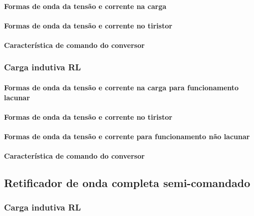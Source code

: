 \documentclass[a4paper,11pt]{article}
\numberwithin{equation}{section}
\begin{document}
\paragraph{Formas de onda da tensão e corrente na carga}

\paragraph{Formas de onda da tensão e corrente no tiristor}

\paragraph{Característica de comando do conversor}

\subsubsection{Carga indutiva RL}

\paragraph{Formas de onda da tensão e corrente na carga para funcionamento lacunar}



\paragraph{Formas de onda da tensão e corrente no tiristor}

\paragraph{Formas de onda da tensão e corrente para funcionamento não lacunar}

\paragraph{Característica de comando do conversor}

\subsection{Retificador de onda completa semi-comandado}

\subsubsection{Carga indutiva RL}
\end{document}
